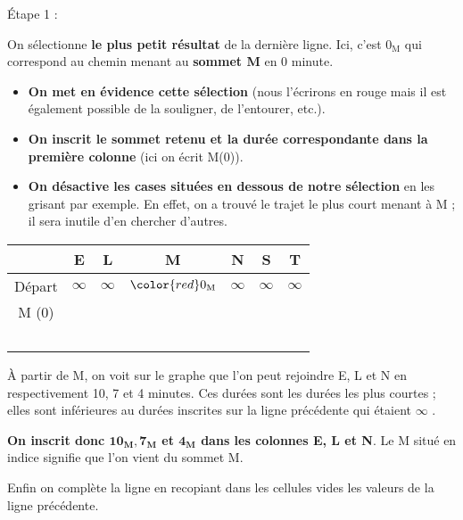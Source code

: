 \begin{h2}\'Etape 1 :\end{h2}
On sélectionne \textbf{le plus petit résultat} de la dernière ligne. Ici, c'est \og $0_{\text{M}}$ \fg{} qui correspond au chemin menant au \textbf{sommet M} en 0 minute.
\begin{itemize}
     \item \textbf{On met en évidence cette sélection} (nous l'écrirons en rouge mais il est également possible de la souligner, de l'entourer, etc.).
     \item \textbf{On inscrit le sommet retenu et la durée correspondante dans la première colonne} (ici on écrit M(0)).
     \item \textbf{On désactive les cases situées en dessous de notre sélection} en les grisant par exemple. En effet, on a trouvé le trajet le plus court menant à M ; il sera inutile d'en chercher d'autres.
\end{itemize}
\begin{center}
     \begin{extern}
          \begin{tabularx}{0.9\linewidth}{|c|C|C|C|C|C|C|}
               \hline
               \			&  E 						& L							& M							& N 							& S								& T  						\\ \hline
               Départ			&  $\infty$	 				& $\infty$					& $\color{red}0_{\text{M}}$	& $\infty$					& $\infty$						& $\infty$	  				\\ \hline
               M (0) 			&  \ 						& \ 							& 		& \ 							& \ 								& \ 											\\ \hline
               \ 				&  \ 						& \ 							& 		& \ 							& \ 								& \ 											\\
          \end{tabularx}
     \end{extern}
\end{center}
\`A partir de M, on voit sur le graphe que l'on peut rejoindre E, L et N en respectivement 10, 7 et 4 minutes. Ces durées sont les durées les plus courtes ; elles sont inférieures au durées inscrites sur la ligne précédente qui étaient \og $\infty$ \fg{}.
\par
\textbf{On inscrit donc $\bm{10_{\text{M}}, 7_{\text{M}}}$ et $\bm{4_{\text{M}}}$ dans les colonnes E, L et N}. Le M situé en indice signifie que l'on vient du sommet M.
\par
Enfin on complète la ligne en recopiant dans les cellules vides les valeurs de la ligne précédente.
